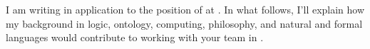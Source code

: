 I am writing in application to the position of \position{} at \companyname{}. In what follows, I'll explain how my background in logic, ontology, computing, philosophy, and natural and formal languages would contribute to working with your team in \city{}.


